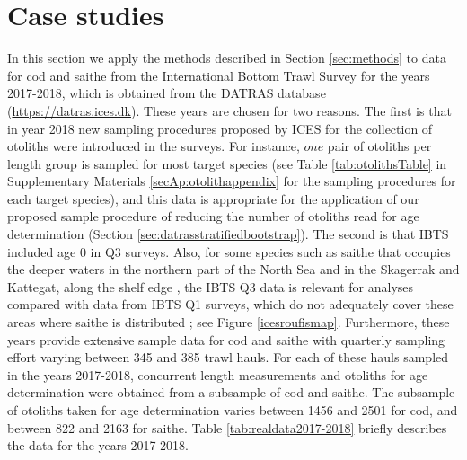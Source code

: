 \documentclass[a4paper 12pt]{article}
\numberwithin{equation}{section}
\begin{document}
\section{Case studies}
\label{sec:data}
In this section we apply the methods described in Section \ref{sec:methods} to data for cod and saithe from the International Bottom Trawl Survey for the years 2017-2018, which is obtained from the DATRAS database (\href{https://datras.ices.dk}{https://datras.ices.dk}). These years are chosen for two reasons. The first is that in year 2018 new sampling procedures proposed by ICES for the collection of otoliths were introduced in the surveys. For instance, $one$ pair of otoliths per length group is sampled for most target species (see Table \ref{tab:otolithsTable} in Supplementary Materials \ref{secAp:otolithappendix} for the sampling procedures for each target species), and this data is appropriate for the application of our proposed sample procedure of reducing the number of otoliths read for age determination (Section \ref{sec:datrasstratifiedbootstrap}). The second is that IBTS included age 0 in Q3 surveys. Also, for some species such as saithe that occupies the deeper waters in the northern part of the North Sea and in the Skagerrak and Kattegat, along the shelf edge \citep{ICESFishMaps}, the IBTS Q3 data is relevant for analyses compared with data from IBTS Q1 surveys, which do not adequately cover these areas where saithe is distributed \citep{ICESJune2016}; see Figure \ref{icesroufismap}. Furthermore, these years provide extensive sample data for cod and saithe with quarterly sampling effort varying between 345 and 385 trawl hauls. For each of these hauls sampled in the years 2017-2018, concurrent length measurements and otoliths for age determination were obtained from a subsample of cod and saithe. The subsample of otoliths taken for age determination varies between 1456 and 2501 for cod, and between 822 and 2163 for saithe. Table \ref{tab:realdata2017-2018} briefly describes the data for the years 2017-2018.\\
\end{document}

